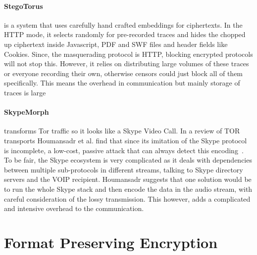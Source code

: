 \documentclass[ %
                    author={Samuel Russell},
                supervisor={Prof. Bogdan Warinschi},
                    degree={MEng},
                     title={Innocuous Ciphertexts},
                  subtitle={The DE-CENSOR Scheme},
                      type={research},
                      year={2018} ]{dissertation}
\begin{document}
\paragraph{StegoTorus} is a system that uses carefully hand crafted embeddings for ciphertexts. In the HTTP mode, it selects randomly for pre-recorded traces and hides the chopped up ciphertext inside Javascript, PDF and SWF files and header fields like Cookies. Since, the masquerading protocol is HTTP, blocking encrypted protocols will not stop this. However, it relies on distributing large volumes of these traces or everyone recording their own, otherwise censors could just block all of them specifically. This means the overhead in communication but mainly storage of traces is large 

\paragraph{SkypeMorph} transforms Tor traffic so it looks like a Skype Video Call.
In a review of TOR transports Houmansadr et al. find that since its imitation of the Skype protocol is incomplete, a low-cost, passive attack that can always detect this encoding~\cite{parot}.
To be fair, the Skype ecosystem is very complicated as it deals with dependencies between multiple sub-protocols in different streams, talking to Skype directory servers and the VOIP recipient. Houmansadr suggests that one solution would be to run the whole Skype stack and then encode the data in the audio stream, with careful consideration of the lossy transmission. This however, adds a complicated and intensive overhead to the communication. 

%
%



\section{Format Preserving Encryption}
\end{document}
